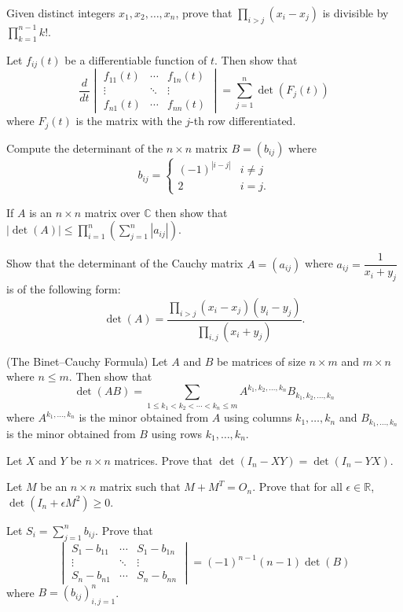 \documentclass[12pt]{article}
\begin{document}
\begin{problems}
\item Given distinct integers $x_1,x_2,\dots,x_n$, prove that $\prod_{i>j}(x_i-x_j)$ is divisible by $\prod_{k=1}^{n-1} k!$.

\item Let $f_{ij}(t)$ be a differentiable function of $t$. Then show that
\[
\frac{d}{dt}\begin{vmatrix} f_{11}(t) & \cdots & f_{1n}(t)\\ \vdots & \ddots & \vdots\\ f_{n1}(t) & \cdots & f_{nn}(t)\end{vmatrix} = \sum_{j=1}^n \det(F_j(t))
\]
where $F_j(t)$ is the matrix with the $j$-th row differentiated.

\item Compute the determinant of the $n\times n$ matrix $B=(b_{ij})$ where
\[
b_{ij} = \begin{cases} (-1)^{|i-j|} & i\ne j\\ 2 & i=j.\end{cases}
\]

\item If $A$ is an $n\times n$ matrix over $\mathbb{C}$ then show that $|\det(A)| \le \prod_{i=1}^n\left(\sum_{j=1}^n |a_{ij}|\right)$.

\item Show that the determinant of the Cauchy matrix $A=(a_{ij})$ where $a_{ij}=\dfrac{1}{x_i+y_j}$ is of the following form:
\[
\det(A) = \frac{\prod_{i>j}(x_i-x_j)(y_i-y_j)}{\prod_{i,j}(x_i+y_j)}.
\]

\item (The Binet--Cauchy Formula) Let $A$ and $B$ be matrices of size $n\times m$ and $m\times n$ where $n\le m$. Then show that
\[
\det(AB) = \sum_{1\le k_1<k_2<\cdots<k_n\le m} A^{k_1,k_2,\dots,k_n}B_{k_1,k_2,\dots,k_n}
\]
where $A^{k_1,\dots,k_n}$ is the minor obtained from $A$ using columns $k_1,\dots,k_n$ and $B_{k_1,\dots,k_n}$ is the minor obtained from $B$ using rows $k_1,\dots,k_n$.

\item Let $X$ and $Y$ be $n\times n$ matrices. Prove that $\det(I_n-XY) = \det(I_n-YX)$.

\item Let $M$ be an $n\times n$ matrix such that $M+M^T=O_n$. Prove that for all $\epsilon\in\mathbb{R}$, $\det(I_n+\epsilon M^2) \ge 0$.

\item Let $S_i = \sum_{j=1}^n b_{ij}$. Prove that
\[
\begin{vmatrix} S_1-b_{11} & \cdots & S_1-b_{1n}\\ \vdots & \ddots & \vdots\\ S_n-b_{n1} & \cdots & S_n-b_{nn}\end{vmatrix} = (-1)^{n-1}(n-1)\det(B)
\]
where $B=(b_{ij})_{i,j=1}^n$.


\end{problems}
\end{document}
